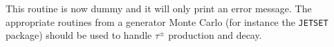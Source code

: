          
         

This routine is now dummy and it will only print an error message.
The appropriate routines from a generator Monte Carlo (for instance 
the {\tt JETSET}~\cite{bib-JETS} package)
should be used to handle $\tau^{\pm}$ production and decay.
